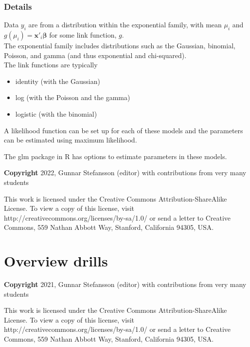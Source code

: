 \documentclass[12pt,a4paper]{article}
\theoremstyle{regla}
\theoremstyle{remark}
\theoremstyle{definition}
\theoremstyle{nonumberbreak}
\begin{document}
\subsubsection{Details}
Data $y_i$ are from a distribution within the exponential family, with mean $\mu_i$ and $g(\mu_i)=\textbf{x}'_i\boldsymbol{\beta}$ for some link function, $g$.\\

The exponential family includes distributions such as the Gaussian, binomial, Poisson, and gamma (and thus exponential and chi-squared).\\  

The link functions are typically 
\begin{itemize}
\item identity (with the Gaussian)
\item log (with the Poisson and the gamma)
\item logistic (with the binomial)
\end{itemize}

A likelihood function can be set up for each of these models and the parameters can be estimated using maximum likelihood.

The glm package in R has options to estimate parameters in these models.




{\bf Copyright}
2022, Gunnar Stefansson (editor) with contributions from very many students

This work is licensed under the Creative Commons
Attribution-ShareAlike License. To view a copy of this license, visit
http://creativecommons.org/licenses/by-sa/1.0/ or send a letter to
Creative Commons, 559 Nathan Abbott Way, Stanford, California 94305,
USA.
\clearpage
\section{Overview drills}
{\bf Copyright}
2021, Gunnar Stefansson (editor) with contributions from very many students

This work is licensed under the Creative Commons
Attribution-ShareAlike License. To view a copy of this license, visit
http://creativecommons.org/licenses/by-sa/1.0/ or send a letter to
Creative Commons, 559 Nathan Abbott Way, Stanford, California 94305,
USA.
\clearpage
\end{document}
